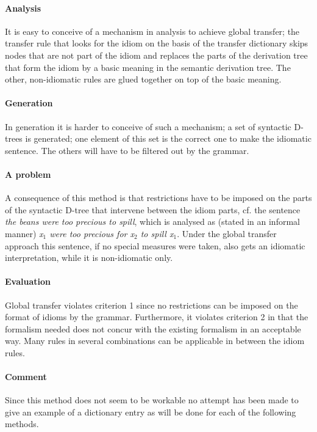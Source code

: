 \paragraph{Analysis}
It is easy to conceive of a mechanism in analysis to achieve global transfer;
the transfer rule that looks for the idiom on the basis of the transfer
dictionary skips nodes that are not part of the idiom and replaces the parts of
the derivation tree that form the idiom by a basic meaning in the semantic
derivation tree. The other, non-idiomatic rules are glued together on top of
the basic meaning. 

\paragraph{Generation}
In generation it is harder to conceive of such a mechanism; a set of syntactic
D-trees is generated; one element of this set is the correct one to make the
idiomatic sentence. The others will have to be filtered out by the grammar. 

\paragraph{A problem}
A consequence of this method is that restrictions have to be imposed on the
parts of the syntactic D-tree that intervene between the idiom parts, cf. the
sentence {\em the beans were too precious to spill}, which is analysed as
(stated in an informal manner) {\em x$_1$ were too precious for x$_2$ to spill
x$_1$}. Under the global transfer approach this sentence, if no special
measures were taken, also gets an idiomatic interpretation, while it is
non-idiomatic only. 

\paragraph{Evaluation}
Global transfer violates criterion 1 since no restrictions can be imposed on
the format of idioms by the grammar. Furthermore, it violates criterion 2 in
that the formalism needed does not concur with the existing formalism in an
acceptable way. Many rules in several combinations can be applicable in between
the idiom rules. 

\paragraph{Comment}
Since this method does not seem to be workable no attempt has been made to give
an example of a dictionary entry as will be done for each of the following
methods. 

